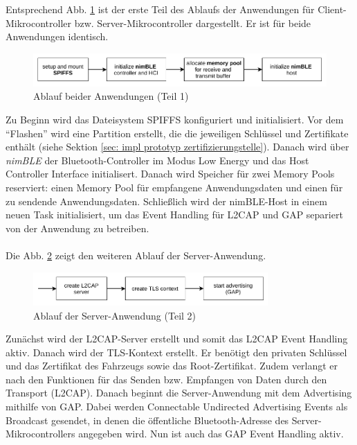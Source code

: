 Entsprechend Abb. \ref{fig: impl ablauf anwendung teil 1} ist der erste Teil des Ablaufs der Anwendungen für Client-Mikrocontroller bzw. Server-Mikrocontroller dargestellt. Er ist für beide Anwendungen identisch.
\begin{figure}[H]
    \centering
    \includegraphics[width=1\textwidth]{graphics/ablauf_anwendung_teil_1.pdf}
    \caption[Ablauf beider Anwendungen (Teil 1)]{Ablauf beider Anwendungen (Teil 1)}
    \label{fig: impl ablauf anwendung teil 1}
\end{figure}
Zu Beginn wird das Dateisystem SPIFFS konfiguriert und initialisiert. Vor dem "`Flashen"' wird eine Partition erstellt, die die jeweiligen Schlüssel und Zertifikate enthält (siehe Sektion \ref{sec: impl prototyp zertifizierungstelle}). Danach wird über \textit{nimBLE} der Bluetooth-Controller im Modus Low Energy und das Host Controller Interface initialisert. Danach wird Speicher für zwei Memory Pools reserviert: einen Memory Pool für empfangene Anwendungsdaten und einen für zu sendende Anwendungsdaten. Schließlich wird der nimBLE-Host in einem neuen Task initialisiert, um das Event Handling für L2CAP und GAP separiert von der Anwendung zu betreiben.
\\\\
Die Abb. \ref{fig: impl ablauf anwendung server teil 2} zeigt den weiteren Ablauf der Server-Anwendung.
\begin{figure}[H]
    \centering
    \includegraphics[width=0.8\textwidth]{graphics/ablauf_anwendung_teil_2_server.pdf}
    \caption[Ablauf der Server-Anwendung (Teil 2)]{Ablauf der Server-Anwendung (Teil 2)}
    \label{fig: impl ablauf anwendung server teil 2}
\end{figure}
Zunächst wird der L2CAP-Server erstellt und somit das L2CAP Event Handling aktiv. Danach wird der TLS-Kontext erstellt. Er benötigt den privaten Schlüssel und das Zertifikat des Fahrzeugs sowie das Root-Zertifikat. Zudem verlangt er nach den Funktionen für das Senden bzw. Empfangen von Daten durch den Transport (L2CAP). Danach beginnt die Server-Anwendung mit dem Advertising mithilfe von GAP. Dabei werden Connectable Undirected Advertising Events als Broadcast gesendet, in denen die öffentliche Bluetooth-Adresse des Server-Mikrocontrollers angegeben wird. Nun ist auch das GAP Event Handling aktiv.
